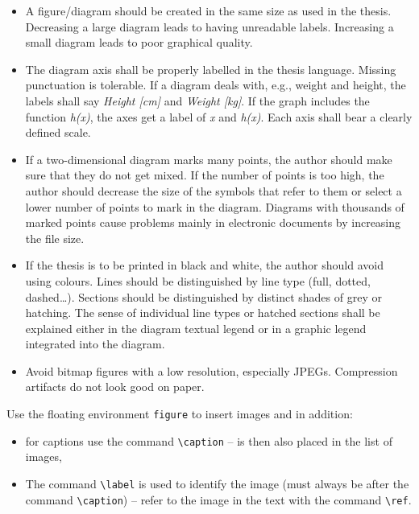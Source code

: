 \begin{itemize}

\item A figure/diagram should be created in the same size as used in the thesis. 
Decreasing a large diagram leads to having unreadable labels. Increasing a small 
diagram leads to poor graphical quality.

\item The diagram axis shall be properly labelled in the thesis language. 
Missing punctuation is tolerable. If a diagram deals with, e.g., weight and 
height, the labels shall say \emph{Height [cm]} and \emph{Weight [kg]}. If the 
graph includes the function \emph{h(x)}, the axes get a label of \emph{x} and 
\emph{h(x)}. Each axis shall bear a clearly defined scale. 

\item If a two-dimensional diagram marks many points, the author should make 
sure that they do not get mixed. If the number of points is too high, the author 
should decrease the size of the symbols that refer to them or select a lower 
number of points to mark in the diagram. Diagrams with thousands of marked 
points cause problems mainly in electronic documents by increasing the file 
size. 

\item If the thesis is to be printed in black and white, the author should avoid 
using colours. Lines should be distinguished by line type (full, dotted, 
dashed…). Sections should be distinguished by distinct shades of grey or 
hatching. The sense of individual line types or hatched sections shall be 
explained either in the diagram textual legend or in a graphic legend integrated 
into the diagram. 

\item Avoid bitmap figures with a low resolution, especially JPEGs. Compression 
artifacts do not look good on paper. 

\end{itemize}

Use the floating environment \verb|figure| to insert images and in addition:
\begin{itemize}
\item for captions use the command \verb|\caption| -- is then also placed in the list of images,
\item The command \verb|\label| is used to identify the image (must always be after the command \verb|\caption|) -- refer to the image in the text with the command \verb|\ref|.
\end{itemize}


